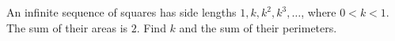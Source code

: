 An infinite sequence of squares has side lengths $1,k,k^2,k^3,\ldots$, where $0<k<1$. The sum of their areas is $2$. Find $k$ and the sum of their perimeters.
